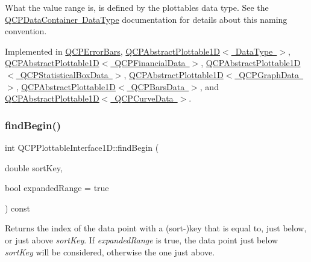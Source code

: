 What the value range is, is defined by the plottable\textquotesingle{}s data type. See the \mbox{\hyperlink{class_q_c_p_data_container_qcpdatacontainer-datatype}{Q\+C\+P\+Data\+Container Data\+Type}} documentation for details about this naming convention. 

Implemented in \mbox{\hyperlink{class_q_c_p_error_bars_af71af55d929d832daf32e283b21e1f3e}{Q\+C\+P\+Error\+Bars}}, \mbox{\hyperlink{class_q_c_p_abstract_plottable1_d_a55f937ba6a63e56e57f0b1a6e85a333a}{Q\+C\+P\+Abstract\+Plottable1\+D$<$ Data\+Type $>$}}, \mbox{\hyperlink{class_q_c_p_abstract_plottable1_d_a55f937ba6a63e56e57f0b1a6e85a333a}{Q\+C\+P\+Abstract\+Plottable1\+D$<$ Q\+C\+P\+Financial\+Data $>$}}, \mbox{\hyperlink{class_q_c_p_abstract_plottable1_d_a55f937ba6a63e56e57f0b1a6e85a333a}{Q\+C\+P\+Abstract\+Plottable1\+D$<$ Q\+C\+P\+Statistical\+Box\+Data $>$}}, \mbox{\hyperlink{class_q_c_p_abstract_plottable1_d_a55f937ba6a63e56e57f0b1a6e85a333a}{Q\+C\+P\+Abstract\+Plottable1\+D$<$ Q\+C\+P\+Graph\+Data $>$}}, \mbox{\hyperlink{class_q_c_p_abstract_plottable1_d_a55f937ba6a63e56e57f0b1a6e85a333a}{Q\+C\+P\+Abstract\+Plottable1\+D$<$ Q\+C\+P\+Bars\+Data $>$}}, and \mbox{\hyperlink{class_q_c_p_abstract_plottable1_d_a55f937ba6a63e56e57f0b1a6e85a333a}{Q\+C\+P\+Abstract\+Plottable1\+D$<$ Q\+C\+P\+Curve\+Data $>$}}.

\mbox{\label{class_q_c_p_plottable_interface1_d_a5b95783271306a4de97be54eac1e7d13}} 
\subsubsection{\texorpdfstring{findBegin()}{findBegin()}}
{\footnotesize\ttfamily int Q\+C\+P\+Plottable\+Interface1\+D\+::find\+Begin (\begin{DoxyParamCaption}\item[{double}]{sort\+Key,  }\item[{bool}]{expanded\+Range = {\ttfamily true} }\end{DoxyParamCaption}) const\hspace{0.3cm}{\ttfamily [pure virtual]}}

Returns the index of the data point with a (sort-\/)key that is equal to, just below, or just above {\itshape sort\+Key}. If {\itshape expanded\+Range} is true, the data point just below {\itshape sort\+Key} will be considered, otherwise the one just above.

